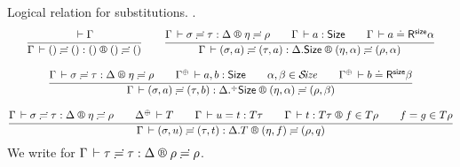\documentclass[acmlarge,review,anonymous]{acmart}\settopmatter{printfolios=true}
\newcommand{\LONGVERSION}[1]{}
\begin{document}
Logical relation for substitutions.
\fbox{$\LRSub \Gamma \sigma \tau \Delta \eta \rho$}.
\begin{gather*}
  \ru{\der \Gamma
    }{\LRSub \Gamma {\sempty} {\sempty} {\cempty} {\sempty} {\sempty}}
\qquad
  \ru{\LRSub \Gamma \sigma \tau \Delta \eta \rho \qquad
      \Gamma \der a : \Size \qquad
      \LRSize \Gamma a \alpha
    }{\LRSub \Gamma {(\sigma,a)} {(\tau,a)} {\cext \Delta \Size} {(\eta,\alpha)} {(\rho,\alpha)}}
\\[2ex]
  \ru{\LRSub \Gamma \sigma \tau \Delta \eta \rho \qquad
      \resurrect \Gamma \der a, b : \Size \qquad
      \alpha,\beta \in \SIZE \qquad
      \LRSize {\resurrect\Gamma} b \beta
    }{\LRSub \Gamma {(\sigma,a)} {(\tau,b)} {\erext \Delta \Size} {(\eta,\alpha)} {(\rho,\beta)}}
\\[2ex]
  \ru{\LRSub \Gamma \sigma \tau \Delta \eta \rho \qquad
      \resurrect \Delta \der T \qquad
      \Gamma \der u = t : T\tau \qquad
      \LR \Gamma t {T \tau} f {T \rho} \qquad
      f = g \in T\rho
    }{\LRSub \Gamma {(\sigma,u)} {(\tau,t)} {\cext \Delta T} {(\eta,f)} {(\rho,q)}}
\end{gather*}
We write \fbox{$\LRS \Gamma \tau \Delta \rho$} for $\LRSub \Gamma \tau \tau \Delta \rho \rho$.

\LONGVERSION{ %
\begin{lemma}[Properties of the logical relation for substitution]
  \label{lem:wklrsub}
  Let $\LRSub \Gamma \sigma \tau \Delta \eta \rho$. Then:
  \begin{enumerate}
  \item Well-typedness: $\Gamma \der \sigma : \Delta$
   and $\Gamma \der \sigma = \sigma \eeq \tau : \Delta$
   [which in turn implies $\Gamma \der \tau : \Delta$].
  \item Weakening:
  If\/ $\xi : \Gamma' \leq \Gamma$ then
  $\LRSub{\Gamma'}{\sigma\xi}{\tau\xi}{\Delta}\eta\rho$.
  \item Resurrection:
  $\LRS {\resurrect\Gamma} \tau {\resurrect\Delta} \rho$.
  \item \label{it:sizesub} Size substitution:
  If\/ $\resurrect\Delta \der a : \Size$ then $a\eta \in \SIZE$.
  \end{enumerate}
\end{lemma}
} %
\LONGVERSION{
\begin{proof}
  For part (\ref{it:sizesub}), the only interesting case $a = \ind i + o$ can be proved by observing that $\eta(i) \in \SIZE$.
\end{proof}
} %
\end{document}

